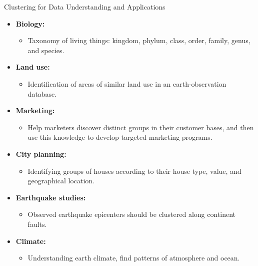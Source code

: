 \begin{frame}{Clustering for Data Understanding and Applications}
	\begin{itemize}
		\item \textbf{Biology:}
		\begin{itemize}
			\item Taxonomy of living things: kingdom, phylum, class, order, 
			family, genus, and species.
		\end{itemize}
		\item \textbf{Land use:}
		\begin{itemize}
			\item Identification of areas of similar land use in an 
			earth-observation database.
		\end{itemize}
		\item \textbf{Marketing:}
		\begin{itemize}
			\item Help marketers discover distinct groups in their customer 
			bases, and then use this knowledge to develop targeted marketing 
			programs.
		\end{itemize}
		\item \textbf{City planning:}
		\begin{itemize}
			\item Identifying groups of houses according to their house type, 
			value, and geographical location.
		\end{itemize}
		\item \textbf{Earthquake studies:}
		\begin{itemize}
			\item Observed earthquake epicenters should be clustered along 
			continent faults.
		\end{itemize}
		\item \textbf{Climate:}
		\begin{itemize}
			\item Understanding earth climate, find patterns of atmosphere and 
			ocean.
		\end{itemize}
	\end{itemize}
\end{frame}

